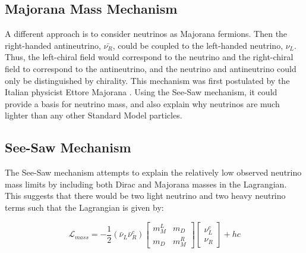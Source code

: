 \subsection{Majorana Mass Mechanism}
A different approach is to consider neutrinos as Majorana fermions. Then the right-handed antineutrino, $\bar{\nu_R}$, could be coupled to the left-handed neutrino, $\nu_L$. Thus, the left-chiral field would correspond to the neutrino and the right-chiral field to correspond to the antineutrino, and the neutrino and antineutrino could only be distinguished by chirality. This mechanism was first postulated by the Italian physicist Ettore Majorana \cite{Majorana_1937}. Using the See-Saw mechanism, it could provide a basis for neutrino mass, and also explain why neutrinos are much lighter than any other Standard Model particles.


\subsection{See-Saw Mechanism}
The See-Saw mechanism attempts to explain the relatively low observed neutrino mass limits by including both Dirac and Majorana masses in the Lagrangian. This suggests that there would be two light neutrino and two heavy neutrino terms such that the Lagrangian is given by:



\begin{equation}\label{mass_lagrangian}
\mathcal{L}_{mass} = -\frac{1}{2}(\bar{\nu}_L\bar{\nu}_R^c) \begin{bmatrix} m_M^L & m_D \\ m_D & m_M^R \end{bmatrix} \begin{bmatrix} \nu_L^c \\ \nu_R \end{bmatrix} + hc
\end{equation}

